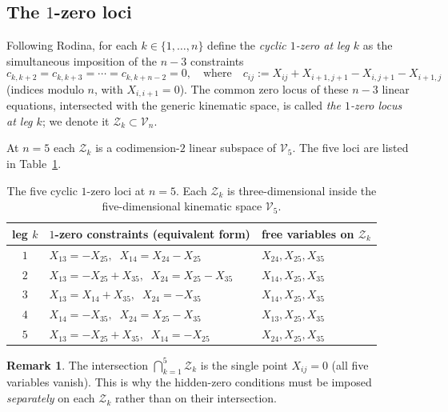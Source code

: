 \documentclass[11pt]{article}
\theoremstyle{plain}
\theoremstyle{definition}
\newtheorem{remark}[theorem]{Remark}
\newcommand{\cV}{\mathcal{V}}
\newcommand{\cZ}{\mathcal{Z}}
\begin{document}
\subsection{The $1$-zero loci}

Following Rodina, for each $k \in \{1, \ldots, n\}$ define the \emph{cyclic $1$-zero
at leg $k$} as the simultaneous imposition of the $n-3$ constraints
\begin{equation}
c_{k, k+2} = c_{k, k+3} = \cdots = c_{k, k+n-2} = 0,
\quad\text{where}\quad
c_{ij} := X_{ij} + X_{i+1,j+1} - X_{i,j+1} - X_{i+1,j}
\label{eq:cdef}
\end{equation}
(indices modulo $n$, with $X_{i,i+1} = 0$). The common zero locus of these $n-3$
linear equations, intersected with the generic kinematic space, is called
\emph{the $1$-zero locus at leg $k$}; we denote it $\cZ_k \subset \cV_n$.

At $n=5$ each $\cZ_k$ is a codimension-$2$ linear subspace of $\cV_5$. The five loci
are listed in Table~\ref{tab:loci}.

\begin{table}[h]
\centering
\begin{tabular}{c|l|l}
\toprule
leg $k$ & $1$-zero constraints (equivalent form) & free variables on $\cZ_k$ \\
\midrule
$1$ & $X_{13} = -X_{25},\;\; X_{14} = X_{24} - X_{25}$ & $X_{24}, X_{25}, X_{35}$ \\
$2$ & $X_{13} = -X_{25} + X_{35},\;\; X_{24} = X_{25} - X_{35}$ & $X_{14}, X_{25}, X_{35}$ \\
$3$ & $X_{13} = X_{14} + X_{35},\;\; X_{24} = -X_{35}$ & $X_{14}, X_{25}, X_{35}$ \\
$4$ & $X_{14} = -X_{35},\;\; X_{24} = X_{25} - X_{35}$ & $X_{13}, X_{25}, X_{35}$ \\
$5$ & $X_{13} = -X_{25} + X_{35},\;\; X_{14} = -X_{25}$ & $X_{24}, X_{25}, X_{35}$ \\
\bottomrule
\end{tabular}
\caption{The five cyclic $1$-zero loci at $n=5$. Each $\cZ_k$ is three-dimensional
inside the five-dimensional kinematic space $\cV_5$.}
\label{tab:loci}
\end{table}

\begin{remark}
The intersection $\bigcap_{k=1}^{5} \cZ_k$ is the single point $X_{ij} = 0$ (all
five variables vanish). This is why the hidden-zero conditions must be imposed
\emph{separately} on each $\cZ_k$ rather than on their intersection.
\end{remark}
\end{document}
